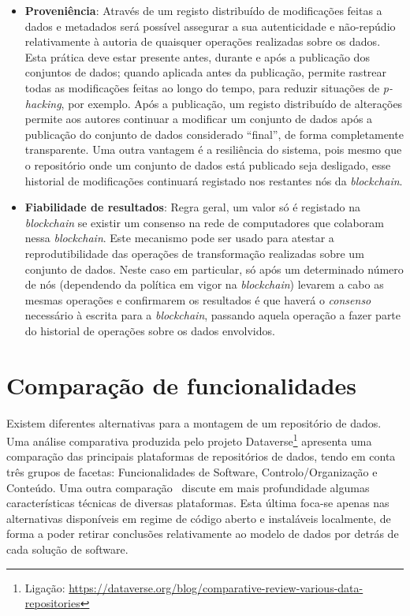 \documentclass[sigconf,nonacm]{acmart}
\begin{document}
\begin{itemize}
	\item \textbf{Proveniência}: Através de um registo distribuído de modificações feitas a dados e metadados será possível assegurar a sua autenticidade e não-repúdio relativamente à autoria de quaisquer operações realizadas sobre os dados. Esta prática deve estar presente antes, durante e após a publicação dos conjuntos de dados; quando aplicada antes da publicação, permite rastrear todas as modificações feitas ao longo do tempo, para reduzir situações de \emph{p-hacking}\cite{10.1371/journal.pbio.1002106}, por exemplo. Após a publicação, um registo distribuído de alterações permite aos autores continuar a modificar um conjunto de dados após a publicação do conjunto de dados considerado ``final'', de forma completamente transparente. Uma outra vantagem é a resiliência do sistema, pois mesmo que o repositório onde um conjunto de dados está publicado seja desligado, esse historial de modificações continuará registado nos restantes nós da \emph{blockchain}.
	\item \textbf{Fiabilidade de resultados}: Regra geral, um valor só é registado na \emph{blockchain} se existir um consenso na rede de computadores que colaboram nessa \emph{blockchain}. Este mecanismo pode ser usado para atestar a reprodutibilidade das operações de transformação realizadas sobre um conjunto de dados. Neste caso em particular, só após um determinado número de nós (dependendo da política em vigor na \emph{blockchain}) levarem a cabo as mesmas operações e confirmarem os resultados é que haverá o \emph{consenso} necessário à escrita para a \emph{blockchain}, passando aquela operação a fazer parte do historial de operações sobre os dados envolvidos.
\end{itemize}



\section{Comparação de funcionalidades} %
\label{sec:comparacao_de_funcionalidades}

Existem diferentes alternativas para a montagem de um repositório de dados. Uma análise comparativa produzida pelo projeto Dataverse\footnote{Ligação:  \url{https://dataverse.org/blog/comparative-review-various-data-repositories}} apresenta uma comparação das principais plataformas de repositórios de dados, tendo em conta três grupos de facetas: Funcionalidades de Software, Controlo/Organização e Conteúdo. Uma outra comparação~\cite{amorimComparison2017} discute em mais profundidade algumas características técnicas de diversas plataformas. Esta última foca-se apenas nas alternativas disponíveis em regime de código aberto e instaláveis localmente, de forma a poder retirar conclusões relativamente ao modelo de dados por detrás de cada solução de software.
\end{document}
